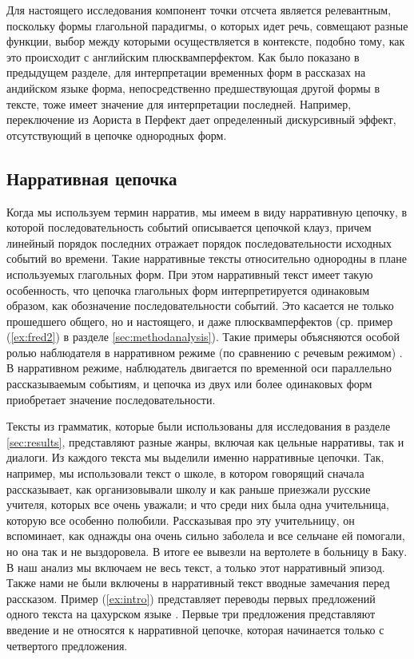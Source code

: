
Для настоящего исследования компонент точки отсчета является релевантным, поскольку формы глагольной парадигмы, о которых идет речь, совмещают разные функции, выбор между которыми осуществляется в контексте, подобно тому, как это происходит с английским плюсквамперфектом. Как было показано в предыдущем разделе, для интерпретации временных форм в рассказах на андийском языке форма, непосредственно предшествующая другой формы в тексте, тоже имеет значение для интерпретации последней. Например, переключение из Аориста в Перфект дает определенный дискурсивный эффект, отсутствующий в цепочке однородных форм.

\subsection{Нарративная цепочка} \label{sec:narseq}

Когда мы используем термин нарратив, мы имеем в виду нарративную цепочку, в которой последовательность событий описывается цепочкой клауз, причем линейный порядок последних отражает порядок последовательности исходных событий во времени. Такие нарративные тексты относительно однородны в плане используемых глагольных форм. При этом нарративный текст имеет такую особенность, что цепочка глагольных форм интерпретируется одинаковым образом, как обозначение последовательности событий. Это касается не только прошедшего общего, но и настоящего, и даже плюсквамперфектов (ср. пример (\ref{ex:fred2}) в разделе \ref{sec:methodanalysis}). Такие примеры объясняются особой ролью наблюдателя в нарративном режиме (по сравнению с речевым режимом) \citep{paducheva2010}. В нарративном режиме, наблюдатель двигается по временной оси параллельно рассказываемым событиям, и цепочка из двух или более одинаковых форм приобретает значение последовательности.
\par Тексты из грамматик, которые были использованы для исследования в разделе \ref{sec:results}, представляют разные жанры, включая как цельные нарративы, так и диалоги. Из каждого текста мы выделили именно нарративные цепочки. Так, например, мы использовали текст о школе, в котором говорящий сначала рассказывает, как организовывали школу и как раньше приезжали русские учителя, которых все очень уважали; и что среди них была одна учительница, которую все особенно полюбили. Рассказывая про эту учительницу, он вспоминает, как однажды она очень сильно заболела и все сельчане ей помогали, но она так и не выздоровела. В итоге ее вывезли на вертолете в больницу в Баку. В наш анализ мы включаем не весь текст, а только этот нарративный эпизод. Также нами не были включены в нарративный текст вводные замечания перед рассказом. Пример (\ref{ex:intro}) представляет переводы первых предложений одного текста на цахурском языке \citep[759--765]{tsakhurgram}. Первые три предложения представляют введение и не относятся к нарративной цепочке, которая начинается только с четвертого предложения.

